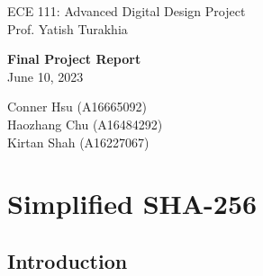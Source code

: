 \documentclass{article}
\begin{document}
\begin{titlepage}
   \begin{center}

       \large ECE 111: Advanced Digital Design Project \\
       Prof. Yatish Turakhia
       \vfill

       \LARGE\textbf{Final Project Report} \\
   \vspace{0.8cm}
       \large June 10, 2023 \\

       \vfill

       Conner Hsu (A16665092) \\
       Haozhang Chu (A16484292) \\
       Kirtan Shah (A16227067)

       \date{\today}

   \end{center}
\end{titlepage}

\tableofcontents

\newpage
\section{Simplified SHA-256}

\subsection{Introduction}

\end{document}
